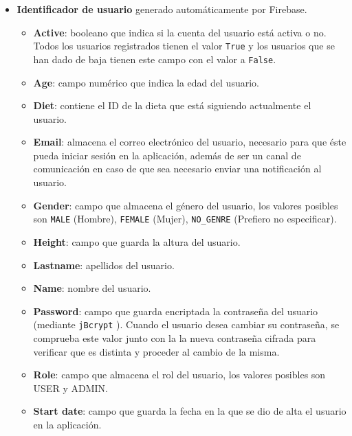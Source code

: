 \begin{itemize}
\item \textbf{Identificador de usuario} generado automáticamente por Firebase.
    \begin{itemize}
        \item \textbf{Active}: booleano que indica si la cuenta del usuario está activa o no. Todos los usuarios registrados tienen el valor \texttt{True} y los usuarios que se han dado de baja tienen este campo con el valor a \texttt{False}.
        \item \textbf{Age}: campo numérico que indica la edad del usuario.
        \item \textbf{Diet}: contiene el ID de la dieta que está siguiendo actualmente el usuario.
        \item \textbf{Email}: almacena el correo electrónico del usuario, necesario para que éste pueda iniciar sesión en la aplicación, además de ser un canal de comunicación en caso de que sea necesario enviar una notificación al usuario.
        \item \textbf{Gender}: campo que almacena el género del usuario, los valores posibles son \texttt{MALE} (Hombre), \texttt{FEMALE} (Mujer), \texttt{NO\_GENRE} (Prefiero no especificar).
        \item \textbf{Height}: campo que guarda la altura del usuario.
        \item \textbf{Lastname}: apellidos del usuario.
        \item \textbf{Name}: nombre del usuario.
        \item \textbf{Password}: campo que guarda encriptada la contraseña del usuario (mediante \texttt{jBcrypt} \cite{jbcrypt}). Cuando el usuario desea cambiar su contraseña, se comprueba este valor junto con la la nueva contraseña cifrada para verificar que es distinta y proceder al cambio de la misma.
        \item \textbf{Role}: campo que almacena el rol del usuario, los valores posibles son USER y ADMIN.
        \item \textbf{Start date}: campo que guarda la fecha en la que se dio de alta el usuario en la aplicación.
        \end{itemize}
\end{itemize}


